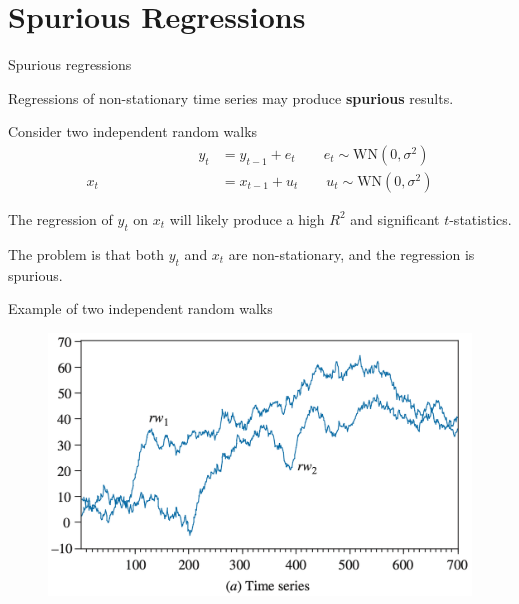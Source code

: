 \documentclass[10pt,aspectratio=169]{beamer}  %
\begin{document}

\section{Spurious Regressions}


\begin{frame}{Spurious regressions}

    \bigskip
    Regressions of non-stationary time series may produce \textbf{spurious} results.

    \medskip
    Consider two independent random walks
    \begin{align*}
        \qquad\qquad\qquad\qquad y_{t} & = y_{t-1} + e_{t} \qquad e_{t} \sim \text{WN} \left( 0, \sigma^{2} \right) \\
        x_{t}                          & = x_{t-1} + u_{t} \qquad u_{t} \sim \text{WN} \left( 0, \sigma^{2} \right)
    \end{align*}

    The regression of $ y_{t} $ on $ x_{t} $ will likely produce a high $ R^{2} $ and significant $ t $-statistics.

    \medskip
    The problem is that both $ y_{t} $ and $ x_{t} $ are non-stationary, and the regression is spurious.

\end{frame}


\begin{frame}{Example of two independent random walks}

    \bigskip
    \begin{figure}[H]
        \centering
        \includegraphics[height=0.5\textwidth]{./fig/rwq-rw2-series.png}
    \end{figure}

\end{frame}
\end{document}
